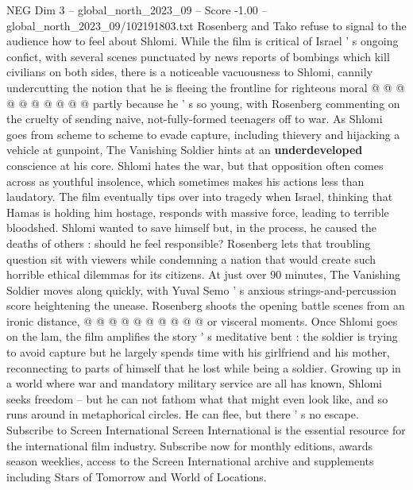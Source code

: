 \begin{textsample}{NEG Dim 3 – global\_north\_2023\_09 – Score -1.00 – global\_north\_2023\_09/102191803.txt}
Rosenberg and Tako refuse to signal to the audience how to feel about Shlomi.
While the film is critical of Israel ' s ongoing confict, with several scenes punctuated by news reports of bombings which kill civilians on both sides, there is a noticeable vacuousness to Shlomi, cannily undercutting the notion that he is fleeing the frontline for righteous moral @ @ @ @ @ @ @ @ @ @ partly because he ' s so young, with Rosenberg commenting on the cruelty of sending naive, not-fully-formed teenagers off to war.
As Shlomi goes from scheme to scheme to evade capture, including thievery and hijacking a vehicle at gunpoint, The Vanishing Soldier hints at an \textbf{underdeveloped} conscience at his core.
Shlomi hates the war, but that opposition often comes across as youthful insolence, which sometimes makes his actions less than laudatory.
The film eventually tips over into tragedy when Israel, thinking that Hamas is holding him hostage, responds with massive force, leading to terrible bloodshed.
Shlomi wanted to save himself but, in the process, he caused the deaths of others : should he feel responsible?
Rosenberg lets that troubling question sit with viewers while condemning a nation that would create such horrible ethical dilemmas for its citizens.
At just over 90 minutes, The Vanishing Soldier moves along quickly, with Yuval Semo ' s anxious strings-and-percussion score heightening the unease.
Rosenberg shoots the opening battle scenes from an ironic distance, @ @ @ @ @ @ @ @ @ @ or visceral moments.
Once Shlomi goes on the lam, the film amplifies the story ' s meditative bent : the soldier is trying to avoid capture but he largely spends time with his girlfriend and his mother, reconnecting to parts of himself that he lost while being a soldier.
Growing up in a world where war and mandatory military service are all has known, Shlomi seeks freedom -- but he can not fathom what that might even look like, and so runs around in metaphorical circles.
He can flee, but there ' s no escape.
Subscribe to Screen International Screen International is the essential resource for the international film industry.
Subscribe now for monthly editions, awards season weeklies, access to the Screen International archive and supplements including Stars of Tomorrow and World of Locations.

\end{textsample}
